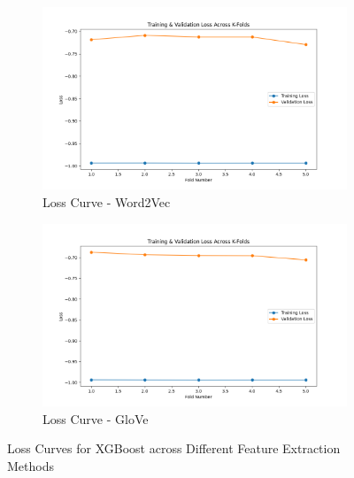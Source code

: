 \begin{figure}[H]
    \begin{subfigure}[b]{0.48\textwidth}
        \includegraphics[width=\textwidth]{img/report_info/img/1.3.XGB/best_xgboost_word2vec_loss.png}
        \caption{Loss Curve - Word2Vec}
        \label{fig:lr-word2vec-loss}
    \end{subfigure}
    \begin{subfigure}[b]{0.48\textwidth}
        \includegraphics[width=\textwidth]{img/report_info/img/1.3.XGB/best_xgboost_glove_loss.png}
        \caption{Loss Curve - GloVe}
        \label{fig:lr-glove-loss}
    \end{subfigure}
    
    \caption{Loss Curves for XGBoost across Different Feature Extraction Methods}
    \label{fig:lr-loss-group}
\end{figure}

